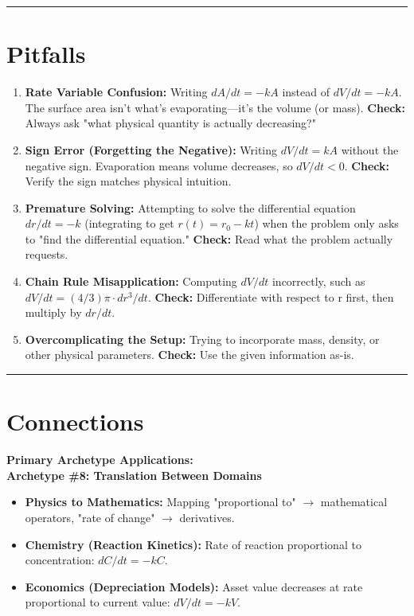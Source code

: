 \documentclass{article}
\begin{document}
\noindent \rule{\textwidth}{0.4pt}

\section*{Pitfalls}

\begin{enumerate}
    \item \textbf{Rate Variable Confusion:} Writing $dA/dt = -kA$ instead of $dV/dt = -kA$. The surface area isn't what's evaporating—it's the volume (or mass). \textbf{Check:} Always ask "what physical quantity is actually decreasing?"
    \item \textbf{Sign Error (Forgetting the Negative):} Writing $dV/dt = kA$ without the negative sign. Evaporation means volume decreases, so $dV/dt < 0$. \textbf{Check:} Verify the sign matches physical intuition.
    \item \textbf{Premature Solving:} Attempting to solve the differential equation $dr/dt = -k$ (integrating to get $r(t) = r_0 - kt$) when the problem only asks to "find the differential equation." \textbf{Check:} Read what the problem actually requests.
    \item \textbf{Chain Rule Misapplication:} Computing $dV/dt$ incorrectly, such as $dV/dt = (4/3)\pi \cdot dr^3/dt$. \textbf{Check:} Differentiate with respect to r first, then multiply by $dr/dt$.
    \item \textbf{Overcomplicating the Setup:} Trying to incorporate mass, density, or other physical parameters. \textbf{Check:} Use the given information as-is.
\end{enumerate}

\noindent \rule{\textwidth}{0.4pt}

\section*{Connections}

\noindent \textbf{Primary Archetype Applications:} \\

\noindent \textbf{Archetype \#8: Translation Between Domains}
\begin{itemize}
    \item \textbf{Physics to Mathematics:} Mapping "proportional to" $\to$ mathematical operators, "rate of change" $\to$ derivatives.
    \item \textbf{Chemistry (Reaction Kinetics):} Rate of reaction proportional to concentration: $dC/dt = -kC$.
    \item \textbf{Economics (Depreciation Models):} Asset value decreases at rate proportional to current value: $dV/dt = -kV$.
\end{itemize}
\end{document}
